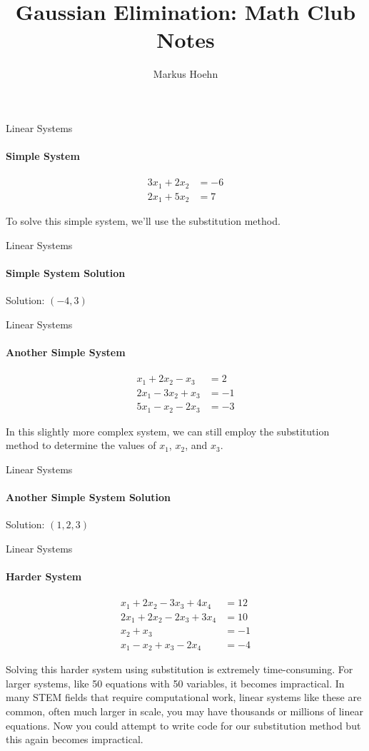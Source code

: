 \documentclass{beamer}
\title{Gaussian Elimination: Math Club Notes}
\author{Markus Hoehn}
\date{}
\begin{document}
\begin{frame}
    \titlepage
\end{frame}

\begin{frame}{Linear Systems}
\framesubtitle{Simple System}
\begin{align*}
    3x_1 + 2x_2 &= -6 \\
    2x_1 + 5x_2 &= 7
\end{align*}

To solve this simple system, we'll use the substitution method.
\end{frame}

\begin{frame}{Linear Systems}
\framesubtitle{Simple System Solution}
Solution: $(-4, 3)$
\end{frame}

\begin{frame}{Linear Systems}
\framesubtitle{Another Simple System}
\begin{align*}
    x_1 + 2x_2 - x_3 &= 2 \\
    2x_1 - 3x_2 + x_3 &= -1 \\
    5x_1 - x_2 - 2x_3 &= -3
\end{align*}

In this slightly more complex system, we can still employ the substitution method to determine the values of $x_1$, $x_2$, and $x_3$.
\end{frame}

\begin{frame}{Linear Systems}
\framesubtitle{Another Simple System Solution}
Solution: $(1, 2, 3)$
\end{frame}

\begin{frame}{Linear Systems}
\framesubtitle{Harder System}
\begin{align*}
    x_1 + 2x_2 - 3x_3 + 4x_4 &= 12 \\
    2x_1 + 2x_2 - 2x_3 + 3x_4 &= 10 \\
    x_2 + x_3 &= -1 \\
    x_1 - x_2 + x_3 - 2x_4 &= -4
\end{align*}

Solving this harder system using substitution is extremely time-consuming. For larger systems, like 50 equations with 50 variables, it becomes impractical. In many STEM fields that require computational work, linear systems like these are common, often much larger in scale, you may have thousands or millions of linear equations. Now you could attempt to write code for our substitution method but this again becomes impractical.

\end{frame}
\end{document}

